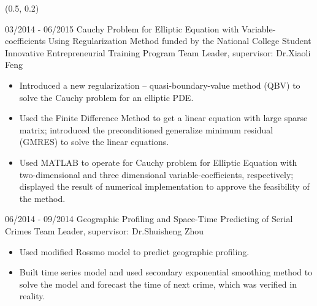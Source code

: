 \documentclass[letterpaper]{twentysecondcv} %
\begin{document}
\begin{textblock}{6}(0.5, 0.2)
	
	\vspace{2mm}
	\courses
	
\end{textblock}
\begin{twenty}

	\twentyitem
	{03/2014}
	{- 06/2015}
	{Cauchy Problem for Elliptic Equation with Variable-coefficients Using Regularization Method}
	{funded by the National College Student Innovative Entrepreneurial Training Program}
	{Team Leader, supervisor: Dr.Xiaoli Feng}
	{
		{\begin{itemize}
				\item Introduced a new regularization -- quasi-boundary-value method (QBV) to solve the Cauchy problem for an elliptic PDE.
				\item Used the Finite Difference Method to get a linear equation with large sparse matrix; introduced the preconditioned generalize minimum residual (GMRES) to solve the linear equations.
				\item Used MATLAB to operate for Cauchy problem for Elliptic Equation with two-dimensional and three dimensional variable-coefficients, respectively; displayed the result of numerical implementation to approve the feasibility of the method. \vspace{2mm}
		\end{itemize}}
	}
	\twentyitem
	{06/2014}
	{- 09/2014}
	{Geographic Profiling and Space-Time Predicting of Serial Crimes}
	{}
	{Team Leader, supervisor: Dr.Shuisheng Zhou}
	{
		{\begin{itemize}
				\item Used modified Rossmo model to predict geographic profiling.
				\item Built time series model and used secondary exponential smoothing method to solve the model and forecast the time of next crime, which was verified in reality.
		\end{itemize}}
	}
\end{twenty}



\end{document}
